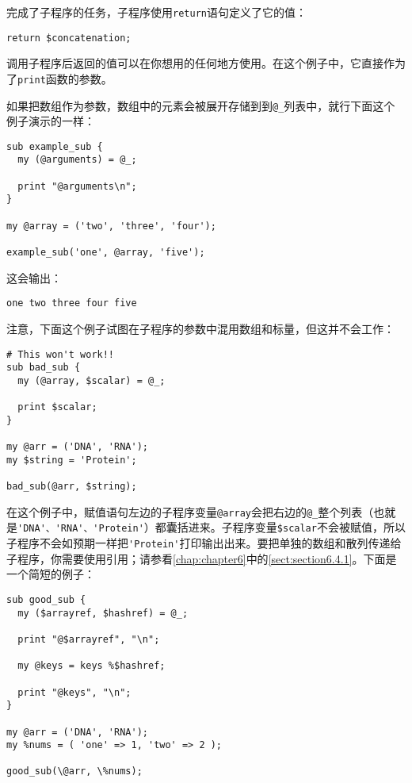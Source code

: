 完成了子程序的任务，子程序使用\verb|return|语句定义了它的值：

\begin{lstlisting}
return $concatenation;
\end{lstlisting}

调用子程序后返回的值可以在你想用的任何地方使用。在这个例子中，它直接作为了\verb|print|函数的参数。

如果把数组作为参数，数组中的元素会被展开存储到到\verb|@_|列表中，就行下面这个例子演示的一样：

\begin{lstlisting}
sub example_sub {
  my (@arguments) = @_;

  print "@arguments\n";
}

my @array = ('two', 'three', 'four');

example_sub('one', @array, 'five');
\end{lstlisting}

这会输出：
 
\begin{lstlisting}
one two three four five
\end{lstlisting}

注意，下面这个例子试图在子程序的参数中混用数组和标量，但这并不会工作：

\begin{lstlisting}
# This won't work!!
sub bad_sub {
  my (@array, $scalar) = @_;

  print $scalar;
}

my @arr = ('DNA', 'RNA');
my $string = 'Protein';

bad_sub(@arr, $string);
\end{lstlisting}

在这个例子中，赋值语句左边的子程序变量\verb|@array|会把右边的\verb|@_|整个列表（也就是\verb|'DNA'、'RNA'、'Protein'|）都囊括进来。子程序变量\verb|$scalar|不会被赋值，所以子程序不会如预期一样把\verb|'Protein'|打印输出出来。要把单独的数组和散列传递给子程序，你需要使用引用；请参看\autoref{chap:chapter6}中的\autoref{sect:section6.4.1}。下面是一个简短的例子：

\begin{lstlisting}
sub good_sub {
  my ($arrayref, $hashref) = @_;

  print "@$arrayref", "\n";

  my @keys = keys %$hashref;

  print "@keys", "\n";
}

my @arr = ('DNA', 'RNA');
my %nums = ( 'one' => 1, 'two' => 2 );

good_sub(\@arr, \%nums);
\end{lstlisting}


